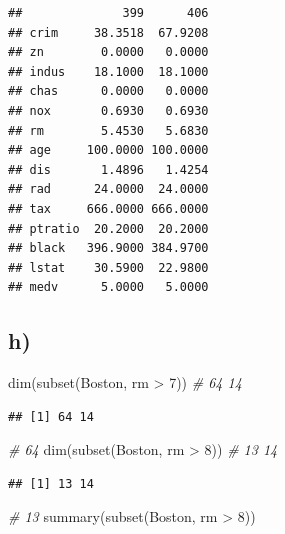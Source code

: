 \documentclass[
]{article}
\newenvironment{Shaded}{\begin{snugshade}}{\end{snugshade}}
\newcommand{\CommentTok}[1]{\textcolor[rgb]{0.56,0.35,0.01}{\textit{#1}}}
\newcommand{\DecValTok}[1]{\textcolor[rgb]{0.00,0.00,0.81}{#1}}
\newcommand{\FunctionTok}[1]{\textcolor[rgb]{0.00,0.00,0.00}{#1}}
\newcommand{\NormalTok}[1]{#1}
\newcommand{\SpecialCharTok}[1]{\textcolor[rgb]{0.00,0.00,0.00}{#1}}
\begin{document}
\begin{verbatim}
##              399      406
## crim     38.3518  67.9208
## zn        0.0000   0.0000
## indus    18.1000  18.1000
## chas      0.0000   0.0000
## nox       0.6930   0.6930
## rm        5.4530   5.6830
## age     100.0000 100.0000
## dis       1.4896   1.4254
## rad      24.0000  24.0000
## tax     666.0000 666.0000
## ptratio  20.2000  20.2000
## black   396.9000 384.9700
## lstat    30.5900  22.9800
## medv      5.0000   5.0000
\end{verbatim}

\hypertarget{h}{%
\subsection{h)}\label{h}}

\begin{Shaded}
\begin{Highlighting}[]
\FunctionTok{dim}\NormalTok{(}\FunctionTok{subset}\NormalTok{(Boston, rm }\SpecialCharTok{\textgreater{}} \DecValTok{7}\NormalTok{)) }\CommentTok{\# 64 14}
\end{Highlighting}
\end{Shaded}

\begin{verbatim}
## [1] 64 14
\end{verbatim}

\begin{Shaded}
\begin{Highlighting}[]
\CommentTok{\# 64}
\FunctionTok{dim}\NormalTok{(}\FunctionTok{subset}\NormalTok{(Boston, rm }\SpecialCharTok{\textgreater{}} \DecValTok{8}\NormalTok{)) }\CommentTok{\# 13 14}
\end{Highlighting}
\end{Shaded}

\begin{verbatim}
## [1] 13 14
\end{verbatim}

\begin{Shaded}
\begin{Highlighting}[]
\CommentTok{\# 13}
\FunctionTok{summary}\NormalTok{(}\FunctionTok{subset}\NormalTok{(Boston, rm }\SpecialCharTok{\textgreater{}} \DecValTok{8}\NormalTok{))}
\end{Highlighting}
\end{Shaded}
\end{document}

